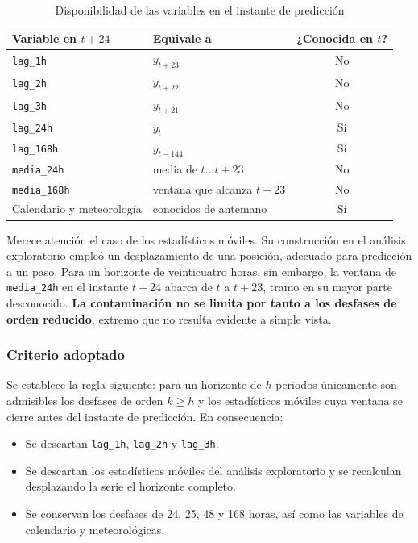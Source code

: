 \begin{table}[H]
\centering
\caption{Disponibilidad de las variables en el instante de predicción}
\label{tab:disponibilidad}
\begin{tabular}{|l|l|c|}
\hline
\rowcolor{grisclaro}
\textbf{Variable en $t+24$} & \textbf{Equivale a} & \textbf{¿Conocida en $t$?} \\
\hline
\texttt{lag\_1h}   & $y_{t+23}$ & No \\
\hline
\texttt{lag\_2h}   & $y_{t+22}$ & No \\
\hline
\texttt{lag\_3h}   & $y_{t+21}$ & No \\
\hline
\texttt{lag\_24h}  & $y_{t}$ & Sí \\
\hline
\texttt{lag\_168h} & $y_{t-144}$ & Sí \\
\hline
\texttt{media\_24h}  & media de $t \ldots t+23$ & No \\
\hline
\texttt{media\_168h} & ventana que alcanza $t+23$ & No \\
\hline
Calendario y meteorología & conocidos de antemano & Sí \\
\hline
\end{tabular}
\end{table}

Merece atención el caso de los estadísticos móviles. Su construcción en el
análisis exploratorio empleó un desplazamiento de una posición, adecuado para
predicción a un paso. Para un horizonte de veinticuatro horas, sin embargo, la
ventana de \texttt{media\_24h} en el instante $t+24$ abarca de $t$ a $t+23$,
tramo en su mayor parte desconocido. \textbf{La contaminación no se limita por
tanto a los desfases de orden reducido}, extremo que no resulta evidente a simple
vista.

\subsubsection*{Criterio adoptado}

Se establece la regla siguiente: para un horizonte de $h$ periodos únicamente son
admisibles los desfases de orden $k \geq h$ y los estadísticos móviles cuya
ventana se cierre antes del instante de predicción. En consecuencia:

\begin{itemize}
  \item Se descartan \texttt{lag\_1h}, \texttt{lag\_2h} y \texttt{lag\_3h}.
  \item Se descartan los estadísticos móviles del análisis exploratorio y se
        recalculan desplazando la serie el horizonte completo.
  \item Se conservan los desfases de 24, 25, 48 y 168 horas, así como las
        variables de calendario y meteorológicas.
\end{itemize}

